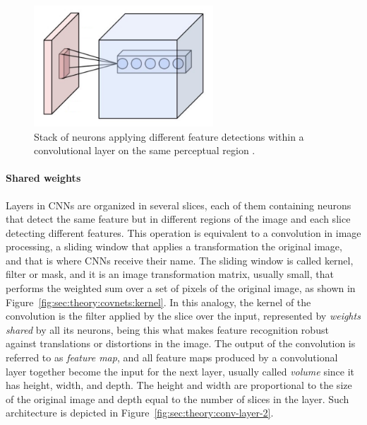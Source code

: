 \begin{figure}[htb]
  \begin{center}
    \includegraphics[width=0.6\textwidth]{gfx/conv-layer-1}
  \end{center}
  \caption{Stack of neurons applying different feature detections within a convolutional layer on the same perceptual region \cite{Aphex342015}.}
  \label{fig:sec:theory:convnets:conv-layer-1}
\end{figure}

\paragraph{Shared weights}
Layers in CNNs are organized in several slices, each of them containing neurons that detect the same feature but in different regions of the image and each slice detecting different features.
This operation is equivalent to a convolution in image processing, a sliding window that applies a transformation the original image, and that is where CNNs receive their name.
The sliding window is called kernel, filter or mask, and it is an image transformation matrix, usually small, that performs the weighted sum over a set of pixels of the original image, as shown in Figure~\ref{fig:sec:theory:covnets:kernel}.
In this analogy, the kernel of the convolution is the filter applied by the slice over the input, represented by \emph{weights shared} by all its neurons, being this what makes feature recognition robust against translations or distortions in the image.
The output of the convolution is referred to as \emph{feature map}, and all feature maps produced by a convolutional layer together become the input for the next layer, usually called \emph{volume} since it has height, width, and depth.
The height and width are proportional to the size of the original image and depth equal to the number of slices in the layer.
Such architecture is depicted in Figure~\ref{fig:sec:theory:conv-layer-2}.

